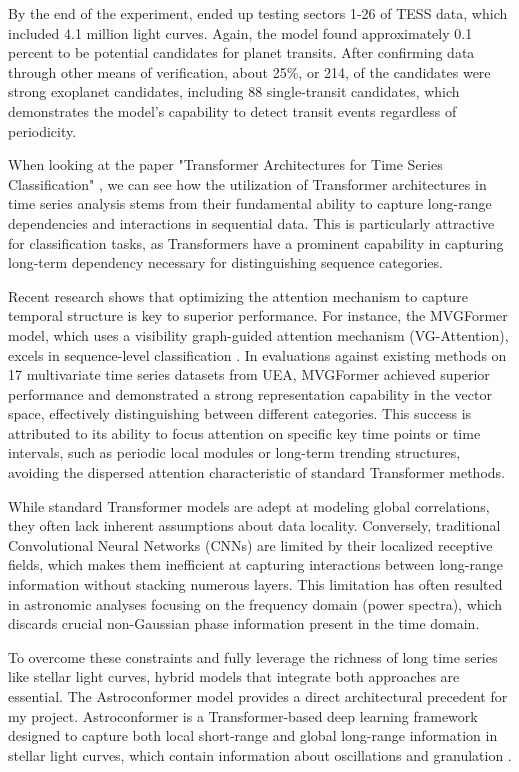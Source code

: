 \documentclass[letterpaper]{article} %
\begin{document}
By the end of the experiment, \citeauthor{salinas2025tessfullframe} ended up testing sectors 1-26 of TESS data, which included 4.1 million light curves. Again, the model found approximately 0.1 percent to be potential candidates for planet transits. After confirming data through other means of verification, about 25\%, or 214, of the candidates were strong exoplanet candidates, including 88 single-transit candidates, which demonstrates the model's capability to detect transit events regardless of periodicity.

When looking at the paper "Transformer Architectures for Time Series Classification" \cite{wen2023transformerstimeseriessurvey}, we can see how the utilization of Transformer architectures in time series analysis stems from their fundamental ability to capture long-range dependencies and interactions in sequential data. This is particularly attractive for classification tasks, as Transformers have a prominent capability in capturing long-term dependency necessary for distinguishing sequence categories.

Recent research shows that optimizing the attention mechanism to capture temporal structure is key to superior performance. For instance, the MVGFormer model, which uses a visibility graph-guided attention mechanism (VG-Attention), excels in sequence-level classification \cite{chen2025graphbased}. In evaluations against existing methods on 17 multivariate time series datasets from UEA, MVGFormer achieved superior performance and demonstrated a strong representation capability in the vector space, effectively distinguishing between different categories. This success is attributed to its ability to focus attention on specific key time points or time intervals, such as periodic local modules or long-term trending structures, avoiding the dispersed attention characteristic of standard Transformer methods.

While standard Transformer models are adept at modeling global correlations, they often lack inherent assumptions about data locality. Conversely, traditional Convolutional Neural Networks (CNNs) are limited by their localized receptive fields, which makes them inefficient at capturing interactions between long-range information without stacking numerous layers. This limitation has often resulted in astronomic analyses focusing on the frequency domain (power spectra), which discards crucial non-Gaussian phase information present in the time domain.

To overcome these constraints and fully leverage the richness of long time series like stellar light curves, hybrid models that integrate both approaches are essential. The Astroconformer model provides a direct architectural precedent for my project. Astroconformer is a Transformer-based deep learning framework designed to capture both local short-range and global long-range information in stellar light curves, which contain information about oscillations and granulation \cite{pan2024astroconformer}.
\end{document}
